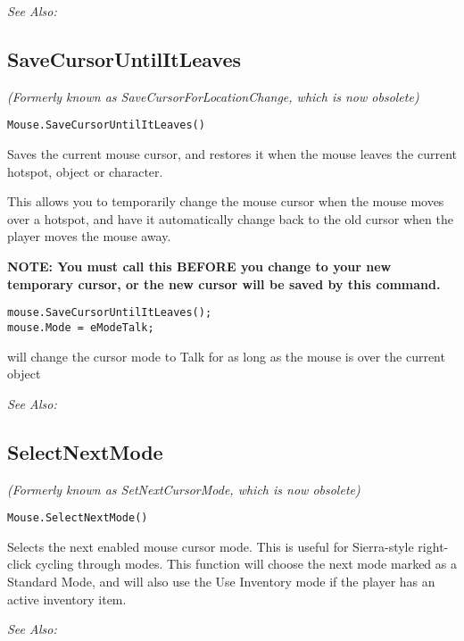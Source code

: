 \it{See Also:} 


\subsection{SaveCursorUntilItLeaves}\label{Mouse.SaveCursorUntilItLeaves}%

\it{(Formerly known as SaveCursorForLocationChange, which is now obsolete)}

\begin{verbatim}
Mouse.SaveCursorUntilItLeaves()
\end{verbatim}
Saves the current mouse cursor, and restores it when the mouse leaves the current hotspot,
object or character.

This allows you to temporarily change the mouse cursor when the mouse moves over a hotspot,
and have it automatically change back to the old cursor when the player moves the mouse away.

\bf{NOTE:} You must call this \bf{BEFORE} you change to your new temporary cursor, or the
new cursor will be saved by this command.

\begin{verbatim}
mouse.SaveCursorUntilItLeaves();
mouse.Mode = eModeTalk;
\end{verbatim}
will change the cursor mode to Talk for as long as the mouse is over the current object

\it{See Also:} 


\subsection{SelectNextMode}\label{Mouse.SelectNextMode}%

\it{(Formerly known as SetNextCursorMode, which is now obsolete)}

\begin{verbatim}
Mouse.SelectNextMode()
\end{verbatim}
Selects the next enabled mouse cursor mode. This is useful for Sierra-style right-click
cycling through modes. This function will choose the next mode marked as a Standard Mode, and
will also use the Use Inventory mode if the player has an active inventory item.

\it{See Also:} 


